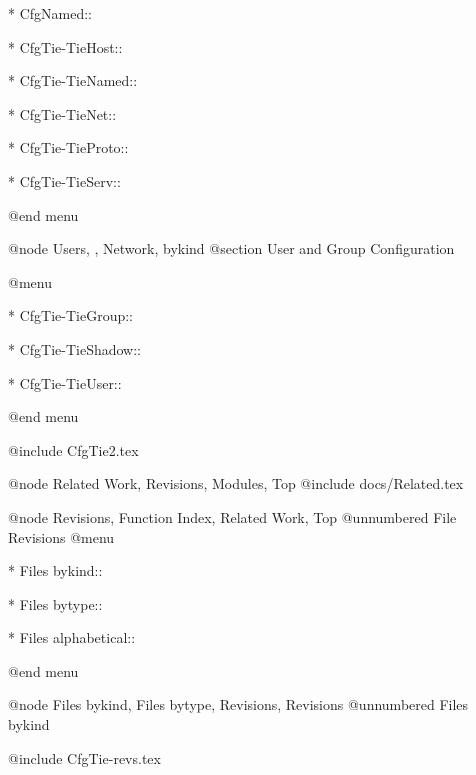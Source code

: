 * CfgNamed::	

* CfgTie-TieHost::	

* CfgTie-TieNamed::	

* CfgTie-TieNet::	

* CfgTie-TieProto::	

* CfgTie-TieServ::	

@end menu

@node Users, , Network, bykind
@section User and Group Configuration

@menu

* CfgTie-TieGroup::

* CfgTie-TieShadow::

* CfgTie-TieUser:: 

@end menu

@include CfgTie2.tex


@node Related Work, Revisions, Modules, Top
@include docs/Related.tex


@node Revisions, Function Index, Related Work, Top
@unnumbered File Revisions
@menu

* Files bykind::

* Files bytype::

* Files alphabetical::

@end menu

@node Files bykind, Files bytype, Revisions, Revisions
@unnumbered Files bykind

@include CfgTie-revs.tex

